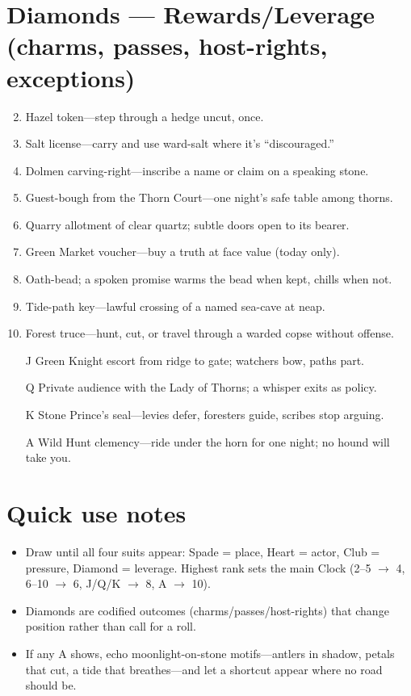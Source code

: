 \section*{Diamonds --- Rewards/Leverage (charms, passes, host-rights, exceptions)}
\begin{enumerate}
\setcounter{enumi}{1}
\item Hazel token---step through a hedge uncut, once.
\item Salt license---carry and use ward-salt where it's ``discouraged.''
\item Dolmen carving-right---inscribe a name or claim on a speaking stone.
\item Guest-bough from the Thorn Court---one night's safe table among thorns.
\item Quarry allotment of clear quartz; subtle doors open to its bearer.
\item Green Market voucher---buy a truth at face value (today only).
\item Oath-bead; a spoken promise warms the bead when kept, chills when not.
\item Tide-path key---lawful crossing of a named sea-cave at neap.
\item Forest truce---hunt, cut, or travel through a warded copse without offense.
\item[J] Green Knight escort from ridge to gate; watchers bow, paths part.
\item[Q] Private audience with the Lady of Thorns; a whisper exits as policy.
\item[K] Stone Prince's seal---levies defer, foresters guide, scribes stop arguing.
\item[A] Wild Hunt clemency---ride under the horn for one night; no hound will take you.
\end{enumerate}

\section*{Quick use notes}
\begin{itemize}
\item Draw until all four suits appear: Spade = place, Heart = actor, Club = pressure, Diamond = leverage. Highest rank sets the main Clock (2--5 $\rightarrow$ 4, 6--10 $\rightarrow$ 6, J/Q/K $\rightarrow$ 8, A $\rightarrow$ 10).
\item Diamonds are codified outcomes (charms/passes/host-rights) that change position rather than call for a roll.
\item If any A shows, echo moonlight-on-stone motifs---antlers in shadow, petals that cut, a tide that breathes---and let a shortcut appear where no road should be.
\end{itemize}
